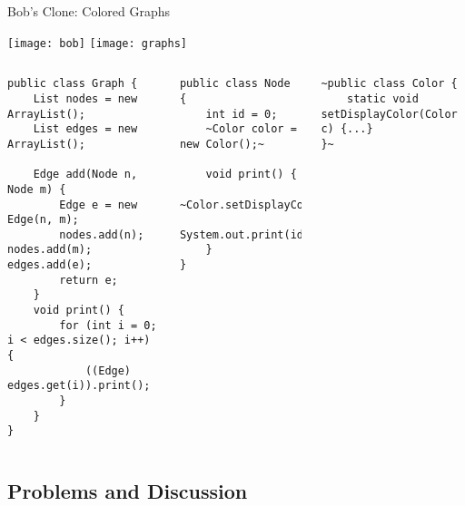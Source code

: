 \begin{frame}[fragile]{Bob's Clone: Colored Graphs}
	\vspace{-1.6cm}
	\begin{flushright}
		\texttt{[image: bob]}
		\texttt{[image: graphs]}
	\end{flushright}
	\vspace{0.1cm}
	\begin{tiny}
		\begin{columns}
				\vspace{-10mm}
\vspace{3mm}					
\begin{lstlisting}
public class Graph {
	List nodes = new ArrayList();
	List edges = new ArrayList();

	Edge add(Node n, Node m) {
		Edge e = new Edge(n, m);
		nodes.add(n); nodes.add(m); edges.add(e);
		return e;
	}
	void print() {
		for (int i = 0; i < edges.size(); i++) {
			((Edge) edges.get(i)).print();
		}
	}
}
\end{lstlisting}	
\begin{lstlisting}
public class Node {
	int id = 0;
	~Color color = new Color();~

	void print() {
		~Color.setDisplayColor(color);~
		System.out.print(id);
	}
}
\end{lstlisting}
\begin{lstlisting}
~public class Color {
	static void setDisplayColor(Color c) {...}
}~
\end{lstlisting}
		\end{columns}
	\end{tiny}
\end{frame}

\subsection{Problems and Discussion}

